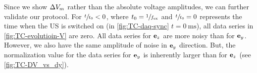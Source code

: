 Since we show $\Delta V_{m}$ rather than the absolute voltage amplitudes, we can 
further validate our protocol. For $\sfrac{t}{t_{0}} < 0$, where $t_{0} = 
\sfrac{1}{f_{\mathrm{ex}}}$ and $\sfrac{t}{t_{0}}=0$ represents the time when the US is 
switched on (in \cref{fig:TC-daq-sync} $t = \SI{0}{\ms}$), all data series in 
\cref{fig:TC-evolutioin-V} are zero. All data series for $\vb{e}_{z}$ are more noisy than 
for $\vb{e}_{y}$. However, we also have the same amplitude of noise in $\vb{e}_{y}$ 
direction. But, the normalization value for the data series for $\vb{e}_{y}$ is 
inherently larger than for $\vb{e}_{z}$ (see \cref{fig:TC-DV_vs_dy}).


